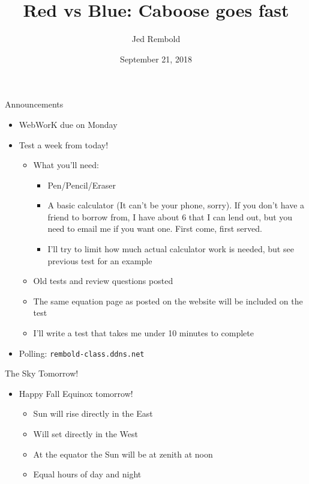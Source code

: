 \documentclass[pdf, aspectratio=169]{beamer}
\title{Red vs Blue: Caboose goes fast}
\date{September 21, 2018}
\author{Jed Rembold}
\begin{document}
\renewcommand*{\theenumi}{\Alph{enumi}}

\begin{frame}{Announcements}
	\begin{itemize}
	  \item WebWorK due on Monday
	  \item Test a week from today!
		\begin{itemize}
		  \item What you'll need:
			\begin{itemize}
			  \item Pen/Pencil/Eraser
			  \item A basic calculator (It can't be your phone, sorry). If you don't have a friend to borrow from, I have about 6 that I can lend out, but you need to email me if you want one. First come, first served.
			  \item I'll try to limit how much actual calculator work is needed, but see previous test for an example
			\end{itemize}
		  \item Old tests and review questions posted
		  \item The same equation page as posted on the website will be included on the test
		  \item I'll write a test that takes me under 10 minutes to complete
		\end{itemize}
	  \item Polling: \nolinkurl{rembold-class.ddns.net}
	\end{itemize}
\end{frame}

\begin{frame}{The Sky  Tomorrow!}
  \begin{itemize}
	\item Happy Fall Equinox tomorrow!
		\begin{itemize}
			\item Sun will rise directly in the East
			\item Will set directly in the West
			\item At the equator the Sun will be at zenith at noon
			\item Equal hours of day and night
		\end{itemize}
  \end{itemize}
\end{frame}
\end{document}
